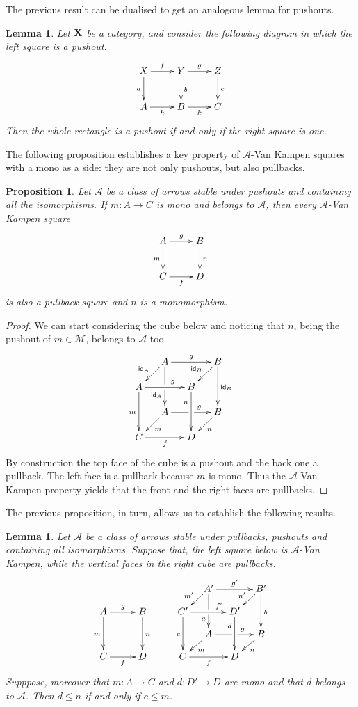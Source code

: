 \documentclass[a4paper]{article}
\newcommand{\id}[1]{\mathsf{id}_{#1}}
\def\C{\textbf {\textup{C}}}
\def\X{\textbf {\textup{X}}}
\newtheorem{proposition}[theorem]{Proposition}
\newtheorem{lemma}[theorem]{Lemma}
\theoremstyle{definition}
\begin{document}
The previous result can be dualised to get an analogous lemma for pushouts.

\begin{lemma}\label{lem:po1}
	Let $\X$ be a category, and consider the following diagram 	in which the left square is a pushout.
	\[\xymatrix{X \ar[d]_{a} \ar[r]^{f}& \ar[r]^{g} Y \ar[d]^{b}& Z \ar[d]^{c}\\ A \ar[r]_{h}& B \ar[r]_{k}& C}\]
	Then the whole rectangle is a pushout if and only if the right square is one.
\end{lemma}

The following proposition establishes a key property of $\mathcal{A}$-Van Kampen squares with a mono as a side: they are not only pushouts, but also pullbacks.
\begin{proposition}\label{prop:pbpo} Let $\mathcal{A}$ be a class of arrows stable under pushouts and containing all the isomorphisms.  If $m\colon A\to C$ is mono and belongs to $\mathcal{A}$, then every $\mathcal{A}$-Van Kampen square
	\[\xymatrix{A\ar[r]^{g} \ar[d]_{m} & B \ar[d]^{n} \\ C \ar[r]_{f}  & D}\]
	is also a pullback square and $n$ is a monomorphism.
\end{proposition}
\begin{proof} We can start considering the cube below and noticing that $n$, being the pushout of $m\in \mathcal{M}$, belongs to $\mathcal{A}$ too.
	\[\xymatrix@C=13pt@R=13pt{&A\ar[dd]|\hole_(.65){\id{A}}\ar[rr]^{g} \ar[dl]_{\id{A}} && B \ar[dd]^{\id{B}} \ar[dl]_{\id{B}} \\ A  \ar[dd]_{m}\ar[rr]^(.65){g} & & B \ar[dd]_(.3){n}\\&A\ar[rr]|\hole^(.65){g} \ar[dl]^{m} && B \ar[dl]^{n} \\C \ar[rr]_{f} & & D}\]
	By construction the top face of the cube is a pushout and the back one a pullback. The left face is a pullback because $m$ is mono. Thus the $\mathcal{A}$-Van Kampen property yields that the front and the right faces are pullbacks. 
\end{proof}

The previous proposition, in turn, allows us to establish the following results.
\begin{lemma}\label{lem:varie}Let $\mathcal{A}$ be a class of arrows stable under pullbacks, pushouts and containing all isomorphisms.  Suppose that, the left square below is $\mathcal{A}$-Van Kampen, while the vertical faces in the right cube are pullbacks.
		\[\xymatrix@C=10pt@R=10pt{&&&&&A'\ar[dd]|\hole_(.65){a}\ar[rr]^{g'} \ar[dl]_{m'} && B' \ar[dd]^{b} \ar[dl]_{n'} \\ A \ar[dd]_{m}\ar[rr]^{g}&&B\ar[dd]^{n}&&C'  \ar[dd]_{c}\ar[rr]^(.7){f'} & & D' \ar[dd]_(.3){d}\\&&&&&A\ar[rr]|\hole^(.65){g} \ar[dl]^{m} && B \ar[dl]^{n} \\C\ar[rr]_{f} &&D&&C \ar[rr]_{f} & & D}\]
Supppose, moreover that $m\colon A\to C$ and $d\colon D'\to D$ are mono and that $d$ belongs to $\mathcal{A}$. Then $d\leq n$ if and only if $c \leq m$.
\end{lemma}
\end{document}
